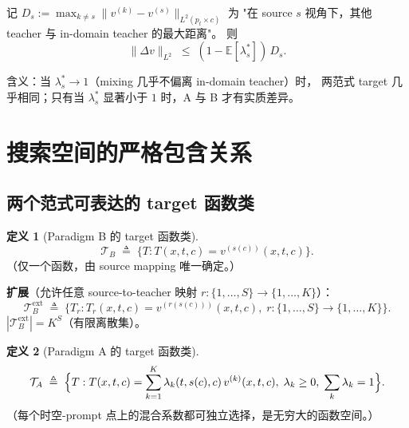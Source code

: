 \documentclass[11pt,a4paper]{article}
\newcommand{\E}{\mathbb{E}}
\theoremstyle{definition}
\newtheorem{definition}{定义}
\begin{document}
记 $D_s := \max_{k \neq s} \|v^{(k)} - v^{(s)}\|_{L^2(p_t \times c)}$ 为
"在 source $s$ 视角下，其他 teacher 与 in-domain teacher 的最大距离"。
则
\begin{equation}
\boxed{
\|\Delta v\|_{L^2} \;\leq\; (1 - \E[\lambda_s^*])\,D_s.
}
\label{eq:Delta_v_bound}
\end{equation}

含义：当 $\lambda_s^* \to 1$（mixing 几乎不偏离 in-domain teacher）时，
两范式 target 几乎相同；只有当 $\lambda_s^*$ 显著小于 $1$ 时，A 与 B
才有实质差异。

\section{搜索空间的严格包含关系}
\label{sec:space_inclusion}

\subsection{两个范式可表达的 target 函数类}

\begin{definition}[Paradigm B 的 target 函数类]
\label{def:T_B}
\begin{equation}
\mathcal{T}_B \;\triangleq\; \big\{T : T(x, t, c) = v^{(s(c))}(x, t, c)\big\}.
\end{equation}
（仅一个函数，由 source mapping 唯一确定。）

\textbf{扩展}（允许任意 source-to-teacher 映射 $r: \{1, \ldots, S\} \to \{1, \ldots, K\}$）：
\begin{equation}
\mathcal{T}_B^{\text{ext}} \;\triangleq\; \big\{T_r : T_r(x, t, c) = v^{(r(s(c)))}(x, t, c),\;r: \{1, \ldots, S\} \to \{1, \ldots, K\}\big\}.
\end{equation}
$|\mathcal{T}_B^{\text{ext}}| = K^S$（有限离散集）。
\end{definition}

\begin{definition}[Paradigm A 的 target 函数类]
\label{def:T_A}
\begin{equation}
\mathcal{T}_A \;\triangleq\; \Bigl\{T : T(x, t, c) = \sum_{k=1}^K \lambda_k(t, s(c), c)\,v^{(k)}(x, t, c),\;\lambda_k \geq 0,\;\sum_k \lambda_k = 1\Bigr\}.
\end{equation}
（每个时空-prompt 点上的混合系数都可独立选择，是无穷大的函数空间。）
\end{definition}
\end{document}
